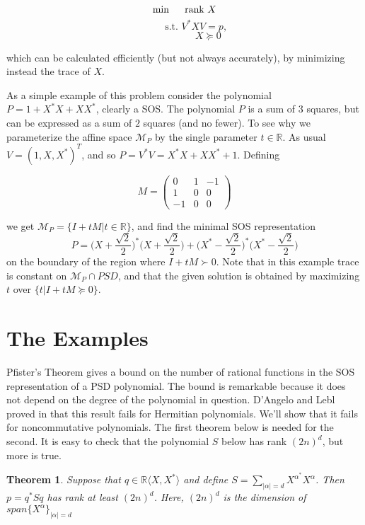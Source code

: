 \documentclass[11pt]{amsart}
\newtheorem{theorem}{Theorem}[section]
\begin{document}
\[\min \hspace{.5cm}  \text{rank  }X\]
\[\hspace{1cm} \text{s.t.   } V^*XV=p,\]
\[\hspace{2cm} X \succeq 0\] 

which can be calculated efficiently (but not always accurately), by minimizing instead the trace of $X$.

As a simple example of this problem consider the polynomial $P=1+X^*X+XX^*$, clearly a SOS. The polynomial $P$ is a sum of $3$ squares, but can be expressed as a sum of $2$ squares (and no fewer).  To see why we parameterize the affine space $\mathcal M_P$ by the single parameter $t \in \mathbb{R}$.  As usual  $V=(1,X,X^*)^T$, and so $P=V^*V=X^*X+XX^*+1$. Defining 

\[M=\begin{pmatrix} 
 0 & 1 & -1\\
 1 & 0 &0\\
  -1 & 0& 0
\end{pmatrix}\]

we get $\mathcal M_P= \{I+tM|t\in \mathbb{R}\}$, and find the minimal SOS representation $$P=\Big(X+\frac{\sqrt{2}}{2}\Big)^*\Big(X+\frac{\sqrt{2}}{2}\Big) +\Big(X^*-\frac{\sqrt{2}}{2}\Big)^*\Big(X^*-\frac{\sqrt{2}}{2}\Big) $$
on the boundary of the region where $I+tM \succ 0$. Note that in this example trace is constant on $\mathcal M_P \cap PSD$, and that the given solution is obtained by maximizing $t$ over $\{t|I+tM \succeq 0\}$.

\section{The Examples}
Pfister's Theorem gives a bound on the number of rational functions in the SOS representation of a PSD polynomial. The bound is remarkable because it does not depend on the degree of the polynomial in question. D'Angelo and Lebl proved in \cite{DAN} that this result fails for Hermitian polynomials.  We'll show that it fails for noncommutative polynomials. The first theorem below is needed for the second. It is easy to check that the polynomial $S$ below has rank $(2n)^d$, but more is true. 
\begin{theorem}
Suppose that $q \in \mathbb{R}\langle X, X^*\rangle$ and define $S=\sum_{|\alpha|=d} X^{\alpha^*}X^\alpha$. Then $p=q^*Sq$ has rank at least $(2n)^d$.  Here, $(2n)^d$ is the dimension of $span\{X^\alpha\}_{|\alpha|=d}$
\end{theorem}
\end{document}
